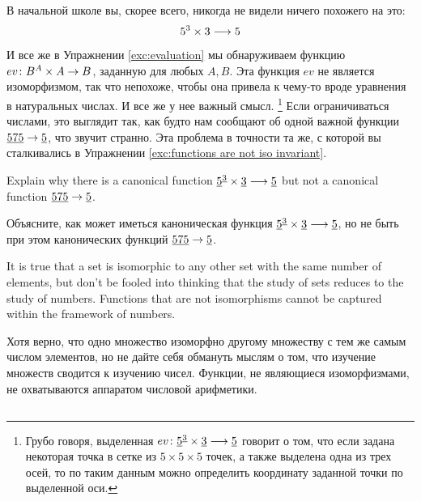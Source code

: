 \documentclass[CT4S-EN-RU]{subfiles}
\begin{document}
\begin{blockRUS}
В начальной школе вы, скорее всего, никогда не видели ничего похожего на это:
$$5^3\times 3\longrightarrow 5$$
И все же в Упражнении \ref{exc:evaluation} мы обнаруживаем функцию $ev\colon B^A\times A\rightarrow B$, заданную для любых $A,B$. Эта функция $ev$ не является изоморфизмом, так что непохоже, чтобы она привела к чему-то вроде уравнения в натуральных числах. И все же у нее важный смысл.%
\footnote{Грубо говоря, выделенная $ev\colon\underline{5}^{\underline{3}}\times\underline{3}\longrightarrow \underline{5}$ говорит о том, что если задана некоторая точка в сетке из $5\times 5\times 5$ точек, а также выделена одна из трех осей, то по таким данным можно определить координату заданной точки по выделенной оси.}
Если ограничиваться числами, это выглядит так, как будто нам сообщают об одной важной функции $\underline{575}\rightarrow\underline{5}$, что звучит странно. Эта проблема в точности та же, с которой вы сталкивались в Упражнении \ref{exc:functions are not iso invariant}.
\end{blockRUS}

\begin{exerciseENG}
Explain why there is a canonical function $\underline{5}^{\underline{3}}\times\underline{3}\longrightarrow \underline{5}$ but not a canonical function $\underline{575}\rightarrow\underline{5}$.
\end{exerciseENG}

\begin{exerciseRUS}
Объясните, как может иметься каноническая функция $\underline{5}^{\underline{3}}\times\underline{3}\longrightarrow \underline{5}$, но не быть при этом канонических функций $\underline{575}\rightarrow\underline{5}$.
\end{exerciseRUS}

\begin{sloganENG}
It is true that a set is isomorphic to any other set with the same number of elements, but don't be fooled into thinking that the study of sets reduces to the study of numbers. Functions that are not isomorphisms cannot be captured within the framework of numbers. 
\end{sloganENG}

\begin{sloganRUS}
Хотя верно, что одно множество изоморфно другому множеству с тем же самым числом элементов, но не дайте себя обмануть мыслям о том, что изучение множеств сводится к изучению чисел. Функции, не являющиеся изоморфизмами, не охватываются аппаратом числовой арифметики. 
\end{sloganRUS}


\subsection{}
\end{document}
